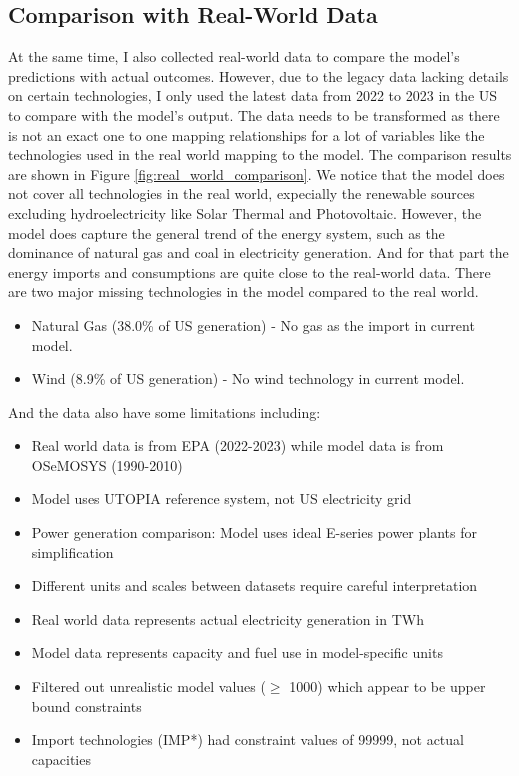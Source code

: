 \documentclass[11pt]{article}
\begin{document}
\subsection{Comparison with Real-World Data}
At the same time, I also collected real-world data to compare the model's predictions with actual outcomes. However, due to the legacy data lacking details on certain technologies, I only used the latest data from 2022 to 2023 in the US to compare with the model's output. The data needs to be transformed as there is not an exact one to one mapping relationships for a lot of variables like the technologies used in the real world mapping to the model. The comparison results are shown in Figure \ref{fig:real_world_comparison}. We notice that the model does not cover all technologies in the real world, expecially the renewable sources excluding hydroelectricity like Solar Thermal and Photovoltaic. However, the model does capture the general trend of the energy system, such as the dominance of natural gas and coal in electricity generation. And for that part the energy imports and consumptions are quite close to the real-world data.
There are two major missing technologies in the model compared to the real world.
\begin{itemize}
    \item Natural Gas (38.0\% of US generation) - No gas as the import in current model.
    \item Wind (8.9\% of US generation) - No wind technology in current model.
\end{itemize}

And the data also have some limitations including:
\begin{itemize}
    \item Real world data is from EPA (2022-2023) while model data is from OSeMOSYS (1990-2010)
    \item Model uses UTOPIA reference system, not US electricity grid
    \item Power generation comparison: Model uses ideal E-series power plants for simplification
    \item Different units and scales between datasets require careful interpretation
    \item Real world data represents actual electricity generation in TWh
    \item Model data represents capacity and fuel use in model-specific units
    \item Filtered out unrealistic model values ($\geq$ 1000) which appear to be upper bound constraints
    \item Import technologies (IMP*) had constraint values of 99999, not actual capacities
\end{itemize}
\end{document}
